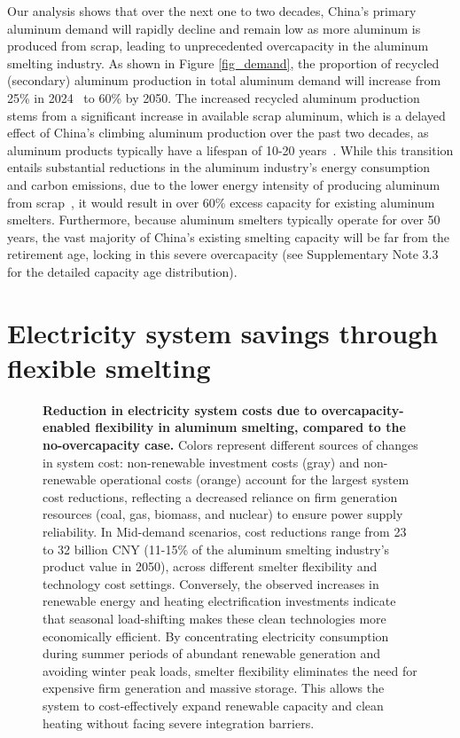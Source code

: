 \documentclass[preprint]{elsarticle}
\begin{document}
Our analysis shows that over the next one to two decades, China's primary aluminum demand will rapidly decline and remain low as more aluminum is produced from scrap, leading to unprecedented overcapacity in the aluminum smelting industry. As shown in Figure \ref{fig_demand}, the proportion of recycled (secondary) aluminum production in total aluminum demand will increase from 25\% in 2024~\citep{ChinaNonferrous2025} to 60\% by 2050. The increased recycled aluminum production stems from a significant increase in available scrap aluminum, which is a delayed effect of China's climbing aluminum production over the past two decades, as aluminum products typically have a lifespan of 10-20 years~\citep{hatayama2012evolution}. While this transition entails substantial reductions in the aluminum industry's energy consumption and carbon emissions, due to the lower energy intensity of producing aluminum from scrap~\citep{li_analysis_2021}, it would result in over 60\% excess capacity for existing aluminum smelters. Furthermore, because aluminum smelters typically operate for over 50 years, the vast majority of China's existing smelting capacity will be far from the retirement age, locking in this severe overcapacity (see Supplementary Note 3.3 for the detailed capacity age distribution).

\section*{\textbf{Electricity system savings through flexible smelting}}

\begin{figure}[!t]
\centering
\caption{\textbf{Reduction in electricity system costs due to overcapacity-enabled flexibility in aluminum smelting, compared to the no-overcapacity case.} Colors represent different sources of changes in system cost: non-renewable investment costs (gray) and non-renewable operational costs (orange) account for the largest system cost reductions, reflecting a decreased reliance on firm generation resources (coal, gas, biomass, and nuclear) to ensure power supply reliability. In Mid-demand scenarios, cost reductions range from 23 to 32 billion CNY (11-15\% of the aluminum smelting industry's product value in 2050), across different smelter flexibility and technology cost settings. Conversely, the observed increases in renewable energy and heating electrification investments indicate that seasonal load-shifting makes these clean technologies more economically efficient. By concentrating electricity consumption during summer periods of abundant renewable generation and avoiding winter peak loads, smelter flexibility eliminates the need for expensive firm generation and massive storage. This allows the system to cost-effectively expand renewable capacity and clean heating without facing severe integration barriers.}
\label{fig_value}
\end{figure}
\end{document}
